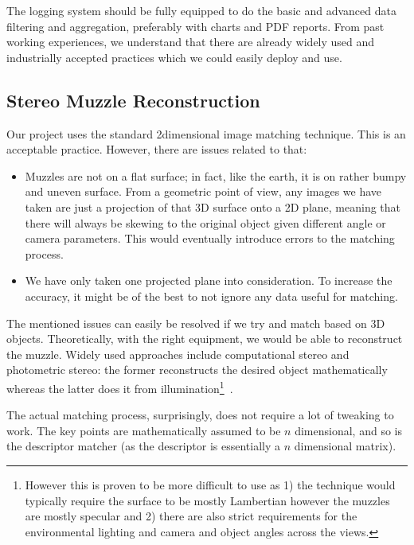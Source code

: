 The logging system should be fully equipped to do the basic and advanced data filtering and aggregation, preferably with charts and PDF reports. From past working experiences, we understand that there are already widely used and industrially accepted practices which we could easily deploy and use.

\subsection{Stereo Muzzle Reconstruction}

Our project uses the standard 2\-dimensional image matching technique. This is an acceptable practice. However, there are issues related to that:

\begin{itemize}
	\item Muzzles are not on a flat surface; in fact, like the earth, it is on rather bumpy and uneven surface. From a geometric point of view, any images we have taken are just a projection of that 3D surface onto a 2D plane, meaning that there will always be skewing to the original object given different angle or camera parameters. This would eventually introduce errors to the matching process.
	\item We have only taken one projected plane into consideration. To increase the accuracy, it might be of the best to not ignore any data useful for matching.
\end{itemize}

The mentioned issues can easily be resolved if we try and match based on 3D objects. Theoretically, with the right equipment, we would be able to reconstruct the muzzle. Widely used approaches include computational stereo and photometric stereo: the former reconstructs the desired object mathematically~\cite{computational_stereo} whereas the latter does it from illumination\footnote{However this is proven to be more difficult to use as 1) the technique would typically require the surface to be mostly Lambertian however the muzzles are mostly specular and 2) there are also strict requirements for the environmental lighting and camera and object angles across the views.}~\cite{photometric_stereo}.

The actual matching process, surprisingly, does not require a lot of tweaking to work. The key points are mathematically assumed to be $n$ dimensional, and so is the descriptor matcher (as the descriptor is essentially a $n$ dimensional matrix).
